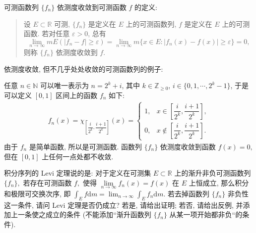 \begin{solution}
  可测函数列 \(\{f_n\}\) 依测度收敛到可测函数 \(f\) 的定义: 

  \begin{quote}
  设 \(E \subset \mathbb{R}\) 可测, \(\{f_n\}\) 是定义在 \(E\) 上的可测函数列, \(f\) 是定义在 \(E\) 上的可测函数. 若对任意 \(\varepsilon > 0\), 总有
  \[\lim\limits_{n\to\infty} m E (\lvert f_n - f \rvert \geqslant \varepsilon) = \lim\limits_{n\to\infty} m \{ x \in E \colon \lvert f_n(x) - f(x) \rvert \geqslant \varepsilon \} = 0,\]
  则称 \(\{f_n\}\) 依测度收敛到 \(f\).
  \end{quote}

  依测度收敛, 但不几乎处处收敛的可测函数列的例子: 

  任意 \(n \in \mathbb{N}\) 可以唯一表示为 \(n = 2^k + i\), 其中 \(k \in \mathbb{Z}_{\geqslant 0}\), \(i \in \{0, 1, \cdots, 2^k - 1\}\), 于是可以定义 \([0, 1]\) 区间上的函数 \(f_n\) 如下:
  \[\begin{aligned}
  f_n(x) = \chi_{\left[ \dfrac{i}{2^k}, \dfrac{i+1}{2^k} \right]}(x) = \begin{cases}
    1, & x \in \left[ \dfrac{i}{2^k}, \dfrac{i+1}{2^k} \right], \\
    0, & x \notin \left[ \dfrac{i}{2^k}, \dfrac{i+1}{2^k} \right].
  \end{cases}
  \end{aligned}\]
  由于 \(f_n\) 是简单函数, 所以是可测函数. 函数列 \(\{f_n\}\) 依测度收敛到函数 \(f(x) = 0,\) 但在 \([0, 1]\) 上任何一点处都不收敛.
\end{solution}

\begin{question}[points = 10]
  积分序列的 Levi 定理说的是: 对于定义在可测集 $E \subset \mathbb{R}$ 上的渐升非负可测函数列 $\{f_n\},$ 若存在可测函数 $f,$ 使得 $\lim\limits_{n\to\infty} f_n(x) = f(x)$ 在 $E$ 上恒成立, 那么积分和极限可交换次序, 即 $\displaystyle \int_E f \mathrm{d} m = \lim_{n \to \infty} \int_E f_n \mathrm{d} m.$ 若去掉函数列 $\{f_n\}$ 非负性这一条件, 请问 Levi 定理是否仍成立? 若是, 请给出证明; 若否, 请给出反例, 并添加上一条使之成立的条件 (不能添加“渐升函数列 $\{f_n\}$ 从某一项开始都非负“的条件).

\end{question}

